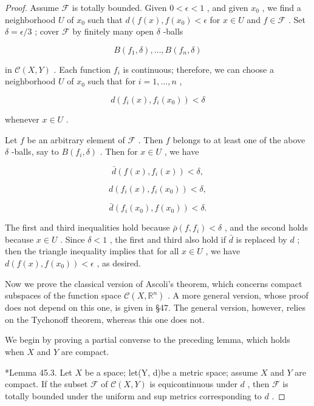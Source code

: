 \begin{proof}Assume \(\mathcal{F}\) is totally bounded. Given \(0 < \epsilon  < 1\) , and given \({x}_{0}\) , we find a neighborhood \(U\) of \({x}_{0}\) such that \(d\left( {f\left( x\right) ,f\left( {x}_{0}\right)  < \epsilon }\right.\) for \(x \in  U\) and \(f \in  \mathcal{F}\) .
Set \(\delta  = \epsilon /3\) ; cover \(\mathcal{F}\) by finitely many open \(\delta\) -balls

\[
B\left( {{f}_{1},\delta }\right) ,\ldots ,B\left( {{f}_{n},\delta }\right)
\]

in \(\mathcal{C}\left( {X,Y}\right)\) . Each function \({f}_{i}\) is continuous; therefore, we can choose a neighborhood \(U\) of \({x}_{0}\) such that for \(i = 1,\ldots ,n\) ,

\[
d\left( {{f}_{i}\left( x\right) ,{f}_{i}\left( {x}_{0}\right) }\right)  < \delta
\]

whenever \(x \in  U\) .

Let \(f\) be an arbitrary element of \(\mathcal{F}\) . Then \(f\) belongs to at least one of the above \(\delta\) -balls, say to \(B\left( {{f}_{i},\delta }\right)\) . Then for \(x \in  U\) , we have

\[
\bar{d}\left( {f\left( x\right) ,{f}_{i}\left( x\right) }\right)  < \delta ,
\]

\[
d\left( {{f}_{i}\left( x\right) ,{f}_{i}\left( {x}_{0}\right) }\right)  < \delta ,
\]

\[
\bar{d}\left( {{f}_{i}\left( {x}_{0}\right) ,f\left( {x}_{0}\right) }\right)  < \delta .
\]

The first and third inequalities hold because \(\bar{\rho }\left( {f,{f}_{i}}\right)  < \delta\) , and the second holds because \(x \in  U\) . Since \(\delta  < 1\) , the first and third also hold if \(\bar{d}\) is replaced by \(d\) ; then the triangle inequality implies that for all \(x \in  U\) , we have \(d\left( {f\left( x\right) ,f\left( {x}_{0}\right) }\right)  < \epsilon\) , as desired.

Now we prove the classical version of Ascoli's theorem, which concerns compact subspaces of the function space \(\mathcal{C}\left( {X,{\mathbb{R}}^{n}}\right)\) . A more general version, whose proof does not depend on this one, is given in §47. The general version, however, relies on the Tychonoff theorem, whereas this one does not.

We begin by proving a partial converse to the preceding lemma, which holds when \(X\) and \(Y\) are compact.

*Lemma 45.3. Let \(X\) be a space; let(Y, d)be a metric space; assume \(X\) and \(Y\) are compact. If the subset \(\mathcal{F}\) of \(\mathcal{C}\left( {X,Y}\right)\) is equicontinuous under \(d\) , then \(\mathcal{F}\) is totally bounded under the uniform and sup metrics corresponding to \(d\) .


\end{proof}
